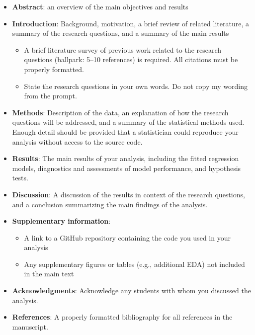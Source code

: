 \documentclass[11pt]{article}
\begin{document}
\begin{itemize}
\item \textbf{Abstract}: an overview of the main objectives and results

\item \textbf{Introduction}: Background, motivation, a brief review of related literature, a summary of the research questions, and a summary of the main results
\begin{itemize}
\item A brief literature survey of previous work related to the research questions (ballpark: 5--10 references) is required. All citations must be properly formatted.

\item State the research questions in your own words. Do not copy my wording from the prompt.
\end{itemize}

\item \textbf{Methods}: Description of the data, an explanation of how the research questions will be addressed, and a summary of the statistical methods used. Enough detail should be provided that a statistician could reproduce your analysis without access to the source code.

\item \textbf{Results}: The main results of your analysis, including the fitted regression models, diagnostics and assessments of model performance, and hypothesis tests.

\item \textbf{Discussion}: A discussion of the results in context of the research questions, and a conclusion summarizing the main findings of the analysis.

\item \textbf{Supplementary information}: 
\begin{itemize}
\item A link to a GitHub repository containing the code you used in your analysis
\item Any supplementary figures or tables (e.g., additional EDA) not included in the main text
\end{itemize}

\item \textbf{Acknowledgments}: Acknowledge any students with whom you discussed the analysis.

\item \textbf{References}: A properly formatted bibliography for all references in the manuscript.
\end{itemize}
\end{document}

